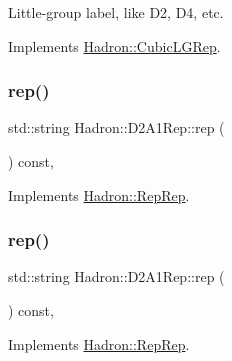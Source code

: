 Little-\/group label, like D2, D4, etc. 

Implements \mbox{\hyperlink{structHadron_1_1CubicLGRep_a9bdb14b519a611d21379ed96a3a9eb41}{Hadron\+::\+Cubic\+L\+G\+Rep}}.

\mbox{\label{structHadron_1_1D2A1Rep_ad489cd29126b2c555a38bb2a5545b2b4}} 
\subsubsection{\texorpdfstring{rep()}{rep()}\hspace{0.1cm}{\footnotesize\ttfamily [1/5]}}
{\footnotesize\ttfamily std\+::string Hadron\+::\+D2\+A1\+Rep\+::rep (\begin{DoxyParamCaption}{ }\end{DoxyParamCaption}) const\hspace{0.3cm}{\ttfamily [inline]}, {\ttfamily [virtual]}}



Implements \mbox{\hyperlink{structHadron_1_1RepRep_ab3213025f6de249f7095892109575fde}{Hadron\+::\+Rep\+Rep}}.

\mbox{\label{structHadron_1_1D2A1Rep_ad489cd29126b2c555a38bb2a5545b2b4}} 
\subsubsection{\texorpdfstring{rep()}{rep()}\hspace{0.1cm}{\footnotesize\ttfamily [2/5]}}
{\footnotesize\ttfamily std\+::string Hadron\+::\+D2\+A1\+Rep\+::rep (\begin{DoxyParamCaption}{ }\end{DoxyParamCaption}) const\hspace{0.3cm}{\ttfamily [inline]}, {\ttfamily [virtual]}}



Implements \mbox{\hyperlink{structHadron_1_1RepRep_ab3213025f6de249f7095892109575fde}{Hadron\+::\+Rep\+Rep}}.

\mbox{\label{structHadron_1_1D2A1Rep_ad489cd29126b2c555a38bb2a5545b2b4}} 
